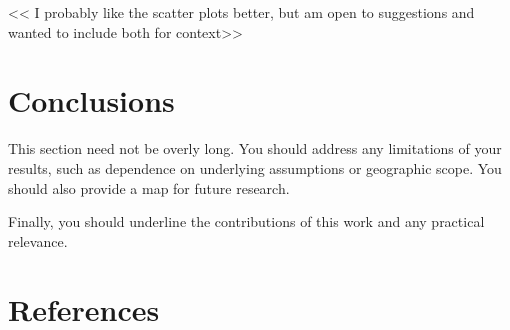 \documentclass[fancy, oneside, mastersfancy, ms]{byuthesis}
\begin{document}
\textless\textless{} I probably like the scatter plots better, but am
open to suggestions and wanted to include both for
context\textgreater\textgreater{}


\hypertarget{conclusions}{%
\chapter{Conclusions}\label{conclusions}}

This section need not be overly long. You should address any limitations
of your results, such as dependence on underlying assumptions or
geographic scope. You should also provide a map for future research.

Finally, you should underline the contributions of this work and any
practical relevance.


\hypertarget{references}{%
\chapter*{References}\label{references}}

\end{document}
